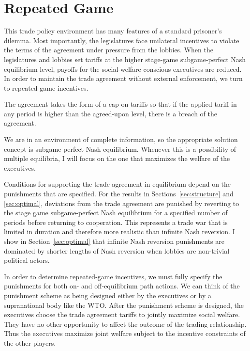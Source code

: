 \documentclass[authoryear, review]{elsarticle}
\begin{document}
\section{Repeated Game}
\label{sec:repeated}
This trade policy environment has many features of a standard prisoner's dilemma. Most importantly, the legislatures face unilateral incentives to violate the terms of the agreement under pressure from the lobbies. When the legislatures and lobbies set tariffs at the higher stage-game subgame-perfect Nash equilibrium level, payoffs for the social-welfare conscious executives are reduced. In order to maintain the trade agreement without external enforcement, we turn to repeated game incentives.

The agreement takes the form of a cap on tariffs so that if the applied tariff in any period is higher than the agreed-upon level, there is a breach of the agreement.

We are in an environment of complete information, so the appropriate solution concept is subgame perfect Nash equilibrium. Whenever this is a possibility of multiple equilibria, I will focus on the one that maximizes the welfare of the executives. 

Conditions for supporting the trade agreement in equilibrium depend on the punishments that are specified. For the results in Sections~\ref{sec:structure} and \ref{sec:optimal}, deviations from the trade agreement are punished by reverting to the stage game subgame-perfect Nash equilibrium for a specified number of periods before returning to cooperation. This represents a trade war that is limited in duration and therefore more realistic than infinite Nash reversion. I show in Section~\ref{sec:optimal} that infinite Nash reversion punishments are dominated by shorter lengths of Nash reversion when lobbies are non-trivial political actors.

In order to determine repeated-game incentives, we must fully specify the punishments for both on- and off-equilibrium path actions. We can think of the punishment scheme as being designed either by the executives or by a supranational body like the WTO. After the punishment scheme is designed, the executives choose the trade agreement tariffs to jointly maximize social welfare. They have no other opportunity to affect the outcome of the trading relationship. Thus the executives maximize joint welfare subject to the incentive constraints of the other players.
\end{document}
